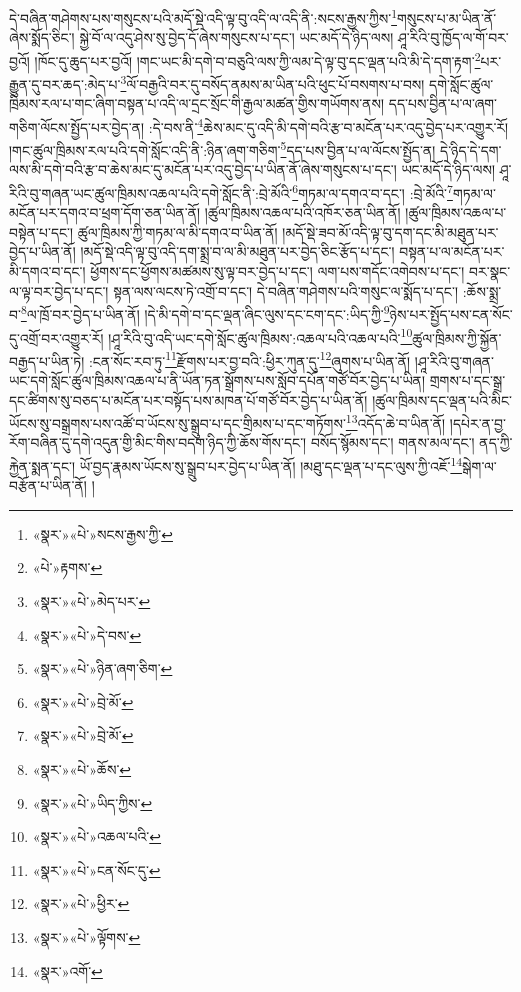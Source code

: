 དེ་བཞིན་གཤེགས་པས་གསུངས་པའི་མདོ་སྡེ་འདི་ལྟ་བུ་འདི་ལ་འདི་ནི་:སངས་རྒྱས་ཀྱིས་\footnote{«སྣར་»«པེ་»སངས་རྒྱས་ཀྱི་}གསུངས་པ་མ་ཡིན་ནོ་ཞེས་སྨོད་ཅིང་། སྐྱེ་བོ་ལ་འདུ་ཤེས་སུ་བྱེད་དོ་ཞེས་གསུངས་པ་དང་། ཡང་མདོ་དེ་ཉིད་ལས། ཤཱ་རིའི་བུ་ཁྱོད་ལ་གོ་བར་བྱའོ། །ཁོང་དུ་ཆུད་པར་བྱའོ། །གང་ཡང་མི་དགེ་བ་བཅུའི་ལས་ཀྱི་ལམ་དེ་ལྟ་བུ་དང་ལྡན་པའི་མི་དེ་དག་རྟག་\footnote{«པེ་»རྟགས་}པར་རྒྱུན་དུ་བར་ཆད་:མེད་པ་\footnote{«སྣར་»«པེ་»མེད་པར་}ལོ་བརྒྱའི་བར་དུ་བསོད་ནམས་མ་ཡིན་པའི་ཕུང་པོ་བསགས་པ་བས། དགེ་སློང་ཚུལ་ཁྲིམས་རལ་པ་གང་ཞིག་བསྟན་པ་འདི་ལ་དྲང་སྲོང་གི་རྒྱལ་མཚན་གྱིས་གཡོགས་ནས། དད་པས་བྱིན་པ་ལ་ཞག་གཅིག་ལོངས་སྤྱོད་པར་བྱེད་ན། :དེ་བས་ནི་\footnote{«སྣར་»«པེ་»དེ་བས་}ཆེས་མང་དུ་འདི་མི་དགེ་བའི་རྩ་བ་མངོན་པར་འདུ་བྱེད་པར་འགྱུར་རོ། །གང་ཚུལ་ཁྲིམས་རལ་པའི་དགེ་སློང་འདི་ནི་:ཉིན་ཞག་གཅིག་\footnote{«སྣར་»«པེ་»ཉིན་ཞག་ཅིག་}དད་པས་བྱིན་པ་ལ་ལོངས་སྤྱོད་ན། དེ་ཉིད་དེ་དག་ལས་མི་དགེ་བའི་རྩ་བ་ཆེས་མང་དུ་མངོན་པར་འདུ་བྱེད་པ་ཡིན་ནོ་ཞེས་གསུངས་པ་དང་། ཡང་མདོ་དེ་ཉིད་ལས། ཤཱ་རིའི་བུ་གཞན་ཡང་ཚུལ་ཁྲིམས་འཆལ་པའི་དགེ་སློང་ནི་:བྲེ་མོའི་\footnote{«སྣར་»«པེ་»བྲེ་མོ་}གཏམ་ལ་དགའ་བ་དང་། :བྲེ་མོའི་\footnote{«སྣར་»«པེ་»བྲེ་མོ་}གཏམ་ལ་མངོན་པར་དགའ་བ་ཕྲག་དོག་ཅན་ཡིན་ནོ། །ཚུལ་ཁྲིམས་འཆལ་པའི་འཁོར་ཅན་ཡིན་ནོ། །ཚུལ་ཁྲིམས་འཆལ་པ་བསྟེན་པ་དང་། ཚུལ་ཁྲིམས་ཀྱི་གཏམ་ལ་མི་དགའ་བ་ཡིན་ནོ། །མདོ་སྡེ་ཟབ་མོ་འདི་ལྟ་བུ་དག་དང་མི་མཐུན་པར་བྱེད་པ་ཡིན་ནོ། །མདོ་སྡེ་འདི་ལྟ་བུ་འདི་དག་སྨྲ་བ་ལ་མི་མཐུན་པར་བྱེད་ཅིང་རྩོད་པ་དང་། བསྟན་པ་ལ་མངོན་པར་མི་དགའ་བ་དང་། ཕྱོགས་དང་ཕྱོགས་མཚམས་སུ་ལྟ་བར་བྱེད་པ་དང་། ལག་པས་གདོང་འགེབས་པ་དང་། བར་སྣང་ལ་ལྟ་བར་བྱེད་པ་དང་། སྟན་ལས་ལངས་ཏེ་འགྲོ་བ་དང་། དེ་བཞིན་གཤེགས་པའི་གསུང་ལ་སྨོད་པ་དང་། :ཆོས་སྨྲ་བ་\footnote{«སྣར་»«པེ་»ཆོས་}ལ་ཁྲོ་བར་བྱེད་པ་ཡིན་ནོ། །དེ་མི་དགེ་བ་དང་ལྡན་ཞིང་ལུས་དང་ངག་དང་:ཡིད་ཀྱི་\footnote{«སྣར་»«པེ་»ཡིད་ཀྱིས་}ཉེས་པར་སྤྱོད་པས་ངན་སོང་དུ་འགྲོ་བར་འགྱུར་རོ། །ཤཱ་རིའི་བུ་འདི་ཡང་དགེ་སློང་ཚུལ་ཁྲིམས་:འཆལ་པའི་འཆལ་པའི་\footnote{«སྣར་»«པེ་»འཆལ་པའི་}ཚུལ་ཁྲིམས་ཀྱི་སྐྱོན་བརྒྱད་པ་ཡིན་ཏེ། :ངན་སོང་རབ་ཏུ་\footnote{«སྣར་»«པེ་»ངན་སོང་དུ་}རྫོགས་པར་བྱ་བའི་:ཕྱིར་ཀུན་དུ་\footnote{«སྣར་»«པེ་»ཕྱིར་}ཞུགས་པ་ཡིན་ནོ། །ཤཱ་རིའི་བུ་གཞན་ཡང་དགེ་སློང་ཚུལ་ཁྲིམས་འཆལ་པ་ནི་ཡོན་ཏན་སྒྲོགས་པས་སློབ་དཔོན་གཙོ་བོར་བྱེད་པ་ཡིན། གྲགས་པ་དང་སྒྲ་དང་ཚིགས་སུ་བཅད་པ་མངོན་པར་བསྟོད་པས་མཁན་པོ་གཙོ་བོར་བྱེད་པ་ཡིན་ནོ། །ཚུལ་ཁྲིམས་དང་ལྡན་པའི་མིང་ཡོངས་སུ་བསྒྲགས་པས་འཚོ་བ་ཡོངས་སུ་སྒྲུབ་པ་དང་གྲིམས་པ་དང་གཏོགས་\footnote{«སྣར་»«པེ་»ལྟོགས་}འདོད་ཆེ་བ་ཡིན་ནོ། །དཔེར་ན་བྱ་རོག་བཞིན་དུ་དགེ་འདུན་གྱི་མིང་གིས་བདག་ཉིད་ཀྱི་ཆོས་གོས་དང་། བསོད་སྙོམས་དང་། གནས་མལ་དང་། ནད་ཀྱི་རྐྱེན་སྨན་དང་། ཡོ་བྱད་རྣམས་ཡོངས་སུ་སྒྲུབ་པར་བྱེད་པ་ཡིན་ནོ། །མཐུ་དང་ལྡན་པ་དང་ལུས་ཀྱི་འཇོ་\footnote{«སྣར་»འགོ་}སྒེག་ལ་བརྩོན་པ་ཡིན་ནོ། །

